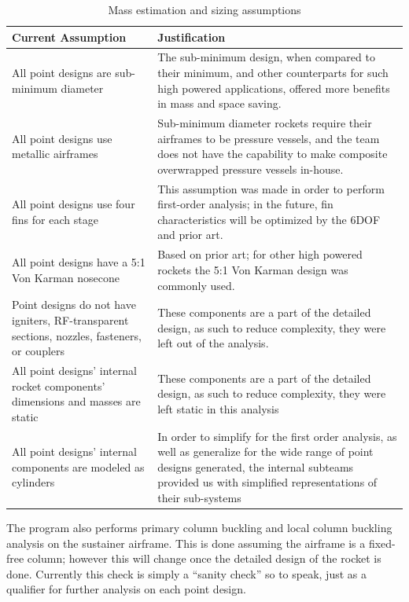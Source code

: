 \begin{table}
    \centering
    \begin{tabular}{ | >{\raggedright}p{} | p{} | } \hline  %
        \textbf{Current Assumption} & \textbf{Justification} \\ \hline
        All point designs are sub-minimum diameter & The sub-minimum design, when compared to their minimum, and other counterparts for such high powered applications, offered more benefits in mass and space saving. \\ \hline
        All point designs use metallic airframes & Sub-minimum diameter rockets require their airframes to be pressure vessels, and the team does not have the capability to make composite overwrapped pressure vessels in-house. \\ \hline
        All point designs use four fins for each stage & This assumption was made in order to perform first-order analysis; in the future, fin characteristics will be optimized by the 6DOF and prior art. \\ \hline
        All point designs have a 5:1 Von Karman nosecone & Based on prior art; for other high powered rockets the 5:1 Von Karman design was commonly used. \\ \hline
        Point designs do not have igniters, RF-transparent sections, nozzles, fasteners, or couplers & These components are a part of the detailed design, as such to reduce complexity, they were left out of the analysis. \\ \hline
        All point designs' internal rocket components' dimensions and masses are static & These components are a part of the detailed design, as such to reduce complexity, they were left static in this analysis \\ \hline
        All point designs' internal components are modeled as cylinders & In order to simplify for the first order analysis, as well as generalize for the wide range of point designs generated, the internal subteams provided us with simplified representations of their sub-systems \\ \hline
    \end{tabular}
    \caption{Mass estimation and sizing assumptions}
    \label{table:mass-script-assumptions}
\end{table}

The program also performs primary column buckling and local column buckling analysis on the sustainer airframe. This is done assuming the airframe is a fixed-free column; however this will change once the detailed design of the rocket is done. Currently this check is simply a ``sanity check'' so to speak, just as a qualifier for further analysis on each point design.


